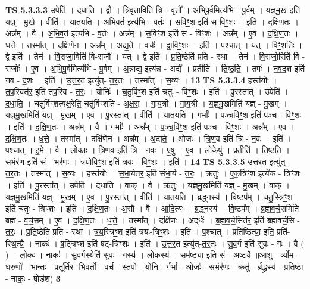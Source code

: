 \documentclass[17pt]{extarticle}
\begin{document}
                  \newline
                                \textbf{ TS 5.3.3.3} \newline
                  उपेति॑ । द॒धा॒ति॒ । द्वौ । त्रि॒वृता॒विति॑ त्रि - वृतौ᳚ । अ॒भि॒पू॒र्वमित्य॑भि - पू॒र्वम् । य॒ज्ञ्॒मु॒ख इति॑ यज्ञ् - मु॒खे । वीति॑ । या॒त॒य॒ति॒ । अ॒भि॒व॒र्त इत्य॑भि - व॒र्तः । स॒विꣳ॒॒श इति॑ स-विꣳ॒॒शः । इति॑ । द॒क्षि॒ण॒तः । अन्न᳚म् । वै । अ॒भि॒व॒र्त इत्य॑भि - व॒र्तः । अन्न᳚म् । स॒विꣳ॒॒श इति॑ स - विꣳ॒॒शः । अन्न᳚म् । ए॒व । द॒क्षि॒ण॒तः । ध॒त्ते॒ । तस्मा᳚त् । दक्षि॑णेन । अन्न᳚म् । अ॒द्य॒ते॒ । वर्चः॑ । द्वा॒विꣳ॒॒शः । इति॑ । प॒श्चात् । यत् । विꣳ॒॒श॒तिः । द्वे इति॑ । तेन॑ । वि॒राजा॒विति॑ वि-राजौ᳚ । यत् । द्वे इति॑ । प्र॒ति॒ष्ठेति॑ प्रति - स्था । तेन॑ । वि॒राजो॒रिति॑ वि - राजोः᳚ । ए॒व । अ॒भि॒पू॒र्वमित्य॑भि - पू॒र्वम् । अ॒न्नाद्य॒ इत्य॑न्न - अद्ये᳚ । प्रतीति॑ । ति॒ष्ठ॒ति॒ । तपः॑ । न॒व॒द॒श इति॑ नव - द॒शः । इति॑ । उ॒त्त॒र॒त इत्यु॑त्- त॒र॒तः । तस्मा᳚त् । स॒व्यः । \textbf{  13} \newline
                  \newline
                                \textbf{ TS 5.3.3.4} \newline
                  हस्त॑योः । त॒प॒स्वित॑र॒ इति॑ तप॒स्वि - त॒रः॒ । योनिः॑ । च॒तु॒र्विꣳ॒॒श इति॑ चतुः - विꣳ॒॒शः । इति॑ । पु॒रस्ता᳚त् । उपेति॑ । द॒धा॒ति॒ । चतु॑र्विꣳशत्यक्ष॒रेति॒ चतु॑र्विꣳशति - अ॒क्ष॒रा॒ । गा॒य॒त्री । गा॒य॒त्री । य॒ज्ञ्॒मु॒खमिति॑ यज्ञ् - मु॒खम् । य॒ज्ञ्॒मु॒खमिति॑ यज्ञ् - मु॒खम् । ए॒व । पु॒रस्ता᳚त् । वीति॑ । या॒त॒य॒ति॒ । गर्भाः᳚ । प॒ञ्च॒विꣳ॒॒श इति॑ पञ्च - विꣳ॒॒शः । इति॑ । द॒क्षि॒ण॒तः । अन्न᳚म् । वै । गर्भाः᳚ । अन्न᳚म् । प॒ञ्च॒विꣳ॒॒श इति॑ पञ्च - विꣳ॒॒शः । अन्न᳚म् । ए॒व । द॒क्षि॒ण॒तः । ध॒त्ते॒ । तस्मा᳚त् । दक्षि॑णेन । अन्न᳚म् । अ॒द्य॒ते॒ । ओजः॑ । त्रि॒ण॒व इति॑ त्रि - न॒वः । इति॑ । प॒श्चात् । इ॒मे । वै । लो॒काः । त्रि॒ण॒व इति॑ त्रि - न॒वः । ए॒षु । ए॒व । लो॒केषु॑ । प्रतीति॑ । ति॒ष्ठ॒ति॒ । स॒भंर॑ण॒ इति॑ सं - भर॑णः । त्र॒यो॒विꣳ॒॒श इति॑ त्रयः - विꣳ॒॒शः । इति॑ । \textbf{  14} \newline
                  \newline
                                \textbf{ TS 5.3.3.5} \newline
                  उ॒त्त॒र॒त इत्यु॑त् - त॒र॒तः । तस्मा᳚त् । स॒व्यः । हस्त॑योः । स॒भां॒र्य॑तर॒ इति॑ संभा॒र्य॑ - त॒रः॒ । क्रतुः॑ । ए॒क॒त्रिꣳ॒॒श इत्ये॑क - त्रिꣳ॒॒शः । इति॑ । पु॒रस्ता᳚त् । उपेति॑ । द॒धा॒ति॒ । वाक् । वै । क्रतुः॑ । य॒ज्ञ्॒मु॒खमिति॑ यज्ञ् - मु॒खम् । वाक् । य॒ज्ञ्॒मु॒खमिति॑ यज्ञ् - मु॒खम् । ए॒व । पु॒रस्ता᳚त् । वीति॑ । या॒त॒य॒ति॒ । ब्र॒द्ध्नस्य॑ । वि॒ष्टप᳚म् । च॒तु॒स्त्रिꣳ॒॒श इति॑ चतुः - त्रिꣳ॒॒शः । इति॑ । द॒क्षि॒ण॒तः । अ॒सौ । वै । आ॒दि॒त्यः । ब्र॒द्ध्नस्य॑ । वि॒ष्टप᳚म् । ब्र॒ह्म॒व॒र्च॒समिति॑ ब्रह्म - व॒र्च॒सम् । ए॒व । द॒क्षि॒ण॒तः । ध॒त्ते॒ । तस्मा᳚त् । दक्षि॑णः । अद्‌र्धः॑ । ब्र॒ह्म॒व॒र्च॒सित॑र॒ इति॑ ब्रह्मवर्च॒सि - त॒रः॒ । प्र॒ति॒ष्ठेति॑ प्रति - स्था । त्र॒य॒स्त्रिꣳ॒॒श इति॑ त्रयः-त्रिꣳ॒॒शः । इति॑ । प॒श्चात् । प्रति॑ष्ठित्या॒ इति॒ प्रति॑-स्थि॒त्यै॒ । नाकः॑ । ष॒ट्त्रिꣳ॒॒श इति॑ षट्-त्रिꣳ॒॒शः । इति॑ । उ॒त्त॒र॒त इत्यु॑त्-त॒र॒तः । सु॒व॒र्ग इति॑ सुवः - गः । वै ( ) । लो॒कः । नाकः॑ । सु॒व॒र्गस्येति॑ सुवः - गस्य॑ । लो॒कस्य॑ । सम॑ष्ट्या॒ इति॒ सं - अ॒ष्ट्यै॒ ॥आ॒शु - र्व्यो॑म - ध॒रुणो॑ - भा॒न्तः - प्रतू᳚र्तिर -भिव॒र्तो - वर्च॒ - स्तपो॒ - योनि॒ - र्गर्भा॒ - ओजः॑ - स॒भंर॑णः॒ - क्रतु॑ - र्ब्र॒द्ध्रस्य॑ - प्रति॒ष्ठा - नाकः॒ - षोड॑श) \textbf{  3} \newline
\end{document}
